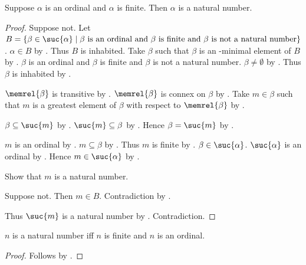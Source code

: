 \begin{theorem}\label{finite_ordinal_is_natural_number}
    Suppose $\alpha$ is an ordinal and $\alpha$ is finite.
    Then $\alpha$ is a natural number.
\end{theorem}
\begin{proof}
    Suppose not.
    Let $B=\{\beta\in\suc{\alpha}\mid
        \text{$\beta$ is an ordinal and $\beta$ is finite and
            $\beta$ is not a natural number}\}$.
    $\alpha\in B$ by .
    Thus $B$ is inhabited.
    Take $\beta$ such that $\beta$ is an \in-minimal element of $B$
        by .
    $\beta$ is an ordinal and $\beta$ is finite and
        $\beta$ is not a natural number.
    $\beta\neq\emptyset$ by .
    Thus $\beta$ is inhabited by .

    $\memrel{\beta}$ is transitive
        by .
    $\memrel{\beta}$ is connex on $\beta$
        by .
    Take $m\in\beta$ such that
        $m$ is a greatest element of $\beta$ with respect to $\memrel{\beta}$
        by .

    $\beta\subseteq\suc{m}$
        by .
    $\suc{m}\subseteq\beta$
        by .
    Hence $\beta=\suc{m}$ by .

    $m$ is an ordinal by .
    $m\subseteq\beta$ by .
    Thus $m$ is finite by .
    $\beta\in\suc{\alpha}$.
    $\suc{\alpha}$ is an ordinal by .
    Hence $m\in\suc{\alpha}$ by .

    Show that $m$ is a natural number.
    \begin{subproof}
        Suppose not.
        Then $m\in B$.
        Contradiction by .
    \end{subproof}
    Thus $\suc{m}$ is a natural number by .
    Contradiction.
\end{proof}

\begin{theorem}\label{natural_number_iff_finite_ordinal}
    $n$ is a natural number iff $n$ is finite and $n$ is an ordinal.
\end{theorem}
\begin{proof}
    Follows by .
\end{proof}
